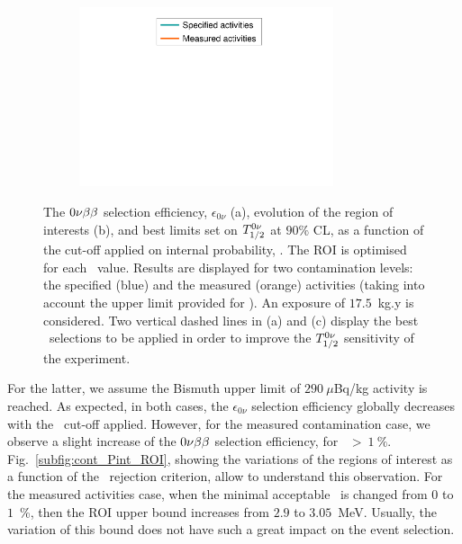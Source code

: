 \begin{figure}[!h]
\begin{subfigure}[t]{0.49\textwidth}
  \captionsetup{justification=justified}
  \caption{
    \label{subfig:cont_Pint_T12}}
\end{subfigure}
\hfill
\begin{subfigure}[t]{0.49\textwidth}
  \centering
  \includegraphics[width=0.82\textwidth]{Sensitivity/fig_sensitivity/legend_cut_Pint.pdf}
  \end{subfigure}
\caption{The $0\nu\beta\beta$ selection efficiency, $\epsilon_{0\nu}$ (a),
  evolution of the region of interests (b),
  and best limits set on $T_{1/2}^{0\nu}$ at $90\%$ CL, as a function of the cut-off applied on internal probability, \Pint.
  The ROI is optimised for each \Pint\ value.
  Results are displayed for two contamination levels: the specified (blue) and the measured (orange) activities (taking into account the upper limit provided for \Bi).
  An exposure of $17.5$~kg.y is considered.
  Two vertical dashed lines in (a) and (c) display the best \Pint\ selections to be applied in order to improve the $T_{1/2}^{0\nu}$ sensitivity of the experiment.
  \label{fig:cont_Pint}}
\end{figure}
For the latter, we assume the Bismuth upper limit of $290~\mu$Bq/kg activity is reached.
As expected, in both cases, the $\epsilon_{0\nu}$ selection efficiency globally decreases with the \Pint\ cut-off applied.
However, for the measured contamination case, we observe a slight increase of the $0\nu\beta\beta$ selection efficiency, for \Pint\ $>~1~\%$.
Fig.~\ref{subfig:cont_Pint_ROI}, showing the variations of the regions of interest as a function of the \Pint\ rejection criterion, allow to understand this observation.
For the measured activities case, when the minimal acceptable \Pint\ is changed from $0$ to $1$~\%, then the ROI upper bound increases from $2.9$ to $3.05$~MeV.
Usually, the variation of this bound does not have such a great impact on the event selection.
